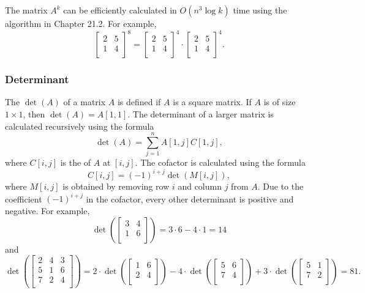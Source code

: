 The matrix $A^k$ can be efficiently calculated
in $O(n^3 \log k)$ time using the
algorithm in Chapter 21.2. For example,
\[
    \begin{bmatrix}
        2 & 5 \\
        1 & 4 \\
    \end{bmatrix}^8 =
    \begin{bmatrix}
        2 & 5 \\
        1 & 4 \\
    \end{bmatrix}^4 \cdot
    \begin{bmatrix}
        2 & 5 \\
        1 & 4 \\
    \end{bmatrix}^4.
\]

\subsubsection{Determinant}


The  $\det(A)$ of a matrix $A$
is defined if $A$ is a square matrix.
If $A$ is of size $1 \times 1$,
then $\det(A)=A[1,1]$.
The determinant of a larger matrix is
calculated recursively using the formula 
\[\det(A)=\sum_{j=1}^n A[1,j] C[1,j],\]
where $C[i,j]$ is the  of $A$
at $[i,j]$.
The cofactor is calculated using the formula
\[C[i,j] = (-1)^{i+j} \det(M[i,j]),\]
where $M[i,j]$ is obtained by removing
row $i$ and column $j$ from $A$.
Due to the coefficient $(-1)^{i+j}$ in the cofactor,
every other determinant is positive
and negative.
For example,
\[
    \det(
    \begin{bmatrix}
            3 & 4 \\
            1 & 6 \\
        \end{bmatrix}
    ) = 3 \cdot 6 - 4 \cdot 1 = 14
\]
and
\[
    \det(
    \begin{bmatrix}
            2 & 4 & 3 \\
            5 & 1 & 6 \\
            7 & 2 & 4 \\
        \end{bmatrix}
    ) =
    2 \cdot
    \det(
    \begin{bmatrix}
            1 & 6 \\
            2 & 4 \\
        \end{bmatrix}
    )
    -4 \cdot
    \det(
    \begin{bmatrix}
            5 & 6 \\
            7 & 4 \\
        \end{bmatrix}
    )
    +3 \cdot
    \det(
    \begin{bmatrix}
            5 & 1 \\
            7 & 2 \\
        \end{bmatrix}
    ) = 81.
\]

